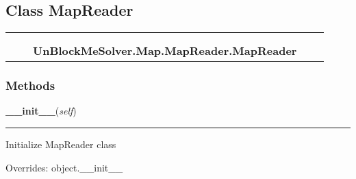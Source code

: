 \subsection{Class MapReader}

    \label{UnBlockMeSolver:Map:MapReader:MapReader}
\begin{tabular}{cccccc}
\multicolumn{2}{r}{\settowidth{\BCL}{object}\multirow{2}{\BCL}{object}}
&&
  \\\cline{3-3}
  &&\multicolumn{1}{c|}{}
&&
  \\
&&\multicolumn{2}{l}{\textbf{UnBlockMeSolver.Map.MapReader.MapReader}}
\end{tabular}



  \subsubsection{Methods}

    \vspace{0.5ex}

\hspace{.8\funcindent}\begin{boxedminipage}{\funcwidth}

    \raggedright \textbf{\_\_init\_\_}(\textit{self})

    \vspace{-1.5ex}

    \rule{\textwidth}{0.5\fboxrule}
\setlength{\parskip}{2ex}
    Initialize MapReader class

\setlength{\parskip}{1ex}
      Overrides: object.\_\_init\_\_

    \end{boxedminipage}

    \label{UnBlockMeSolver:Map:MapReader:MapReader:load}

    \vspace{0.5ex}

